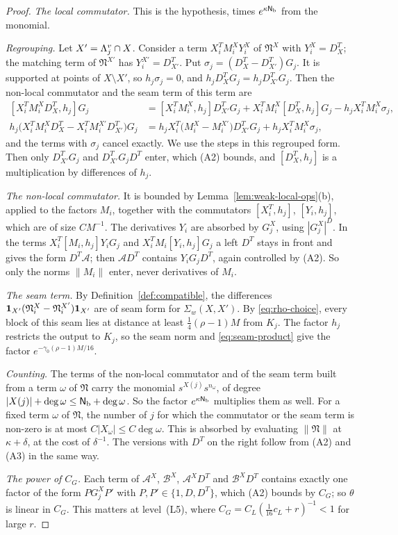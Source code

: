 \begin{proof}
\emph{The local commutator.} This is the hypothesis, times $e^{\kappa\mathsf N_{\rm b}}$ from the monomial.

\emph{Regrouping.} Let $X'=\Lambda^v_j\cap X$. Consider a term $X_i^TM^X_iY^X_i$ of $\mathfrak N^X$ with $Y^X_i=D^T_X$; the matching term of $\mathfrak N^{X'}$ has $Y^{X'}_i=D^T_{X'}$. Put $\sigma_j=(D^T_X-D^T_{X'})G_j$. It is supported at points of $X\setminus X'$, so $h_j\sigma_j=0$, and $h_jD^T_XG_j=h_jD^T_{X'}G_j$. Then the non-local commutator and the seam term of this term are
\[
\begin{aligned}
{}[X_i^TM^X_iD^T_X,h_j]G_j&=[X_i^TM^X_i,h_j]D^T_{X'}G_j+X_i^TM^X_i[D^T_X,h_j]G_j-h_jX_i^TM^X_i\sigma_j,\\
h_j\big(X_i^TM^X_iD^T_X-X_i^TM^{X'}_iD^T_{X'}\big)G_j&=h_jX_i^T\big(M^X_i-M^{X'}_i\big)D^T_{X'}G_j+h_jX_i^TM^X_i\sigma_j ,
\end{aligned}
\]
and the terms with $\sigma_j$ cancel exactly. We use the steps in this regrouped form. Then only $D^T_{X'}G_j$ and $D^T_{X'}G_jD^T$ enter, which (A2) bounds, and $[D^T_X,h_j]$ is a multiplication by differences of $h_j$.

\emph{The non-local commutator.} It is bounded by Lemma~\ref{lem:weak-local-ops}(b), applied to the factors $M_i$, together with the commutators $[X_i^T,h_j]$, $[Y_i,h_j]$, which are of size $CM^{-1}$. The derivatives $Y_i$ are absorbed by $G^X_j$, using $|G^X_j|^D$. In the terms $X_i^T[M_i,h_j]Y_iG_j$ and $X_i^TM_i[Y_i,h_j]G_j$ a left $D^T$ stays in front and gives the form $D^T\mathcal A$; then $\mathcal AD^T$ contains $Y_iG_jD^T$, again controlled by (A2). So only the norms $\|M_i\|$ enter, never derivatives of $M_i$.

\emph{The seam term.} By Definition~\ref{def:compatible}, the differences $\mathbf 1_{X'}(\mathfrak N^X_i-\mathfrak N^{X'}_i)\mathbf 1_{X'}$ are of seam form for $\Sigma_w(X,X')$. By \eqref{eq:rho-choice}, every block of this seam lies at distance at least $\frac14(\rho-1)M$ from $K_j$. The factor $h_j$ restricts the output to $K_j$, so the seam norm and \eqref{eq:seam-product} give the factor $e^{-\gamma_0(\rho-1)M/16}$.

\emph{Counting.} The terms of the non-local commutator and of the seam term built from a term $\omega$ of $\mathfrak N$ carry the monomial $s^{X(j)}s^{n_\omega}$, of degree $|X(j)|+\deg\omega\le\mathsf N_{\rm b}+\deg\omega$. So the factor $e^{\kappa\mathsf N_{\rm b}}$ multiplies them as well. For a fixed term $\omega$ of $\mathfrak N$, the number of $j$ for which the commutator or the seam term is non-zero is at most $C|X_\omega|\le C\deg\omega$. This is absorbed by evaluating $\|\mathfrak N\|$ at $\kappa+\delta$, at the cost of $\delta^{-1}$. The versions with $D^T$ on the right follow from (A2) and (A3) in the same way.

\emph{The power of $C_G$.} Each term of $\mathcal A^X$, $\mathcal B^X$, $\mathcal A^XD^T$ and $\mathcal B^XD^T$ contains exactly one factor of the form $PG^X_jP'$ with $P,P'\in\{1,D,D^T\}$, which (A2) bounds by $C_G$; so $\theta$ is linear in $C_G$. This matters at level~(L5), where $C_G=C_L(\frac1{16}c_L+r)^{-1}<1$ for large $r$.
\end{proof}

